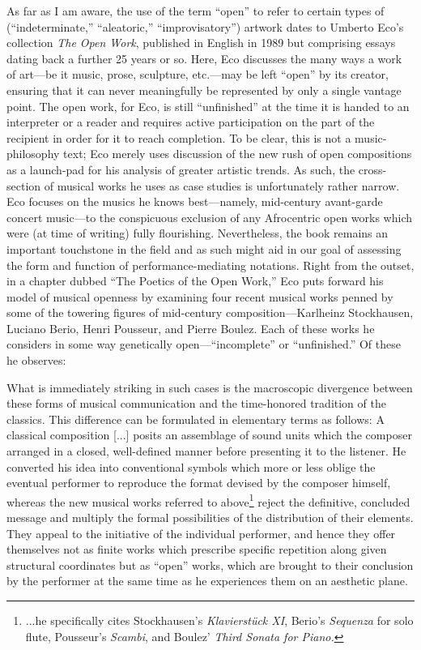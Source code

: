     As far as I am aware, the use of the term ``open'' to refer to certain types of (``indeterminate,'' ``aleatoric,'' ``improvisatory'') artwork dates to Umberto Eco's collection \textit{The Open Work}, published in English in 1989 but comprising essays dating back a further 25 years or so. Here, Eco discusses the many ways a work of art---be it music, prose, sculpture, etc.---may be left ``open'' by its creator, ensuring that it can never meaningfully be represented by only a single vantage point. The open work, for Eco, is still ``unfinished'' at the time it is handed to an interpreter or a reader and requires active participation on the part of the recipient in order for it to reach completion. To be clear, this is not a music-philosophy text; Eco merely uses discussion of the new rush of open compositions as a launch-pad for his analysis of greater artistic trends. As such, the cross-section of musical works he uses as case studies is unfortunately rather narrow. Eco focuses on the musics he knows best---namely, mid-century avant-garde concert music---to the conspicuous exclusion of any Afrocentric open works which were (at time of writing) fully flourishing. Nevertheless, the book remains an important touchstone in the field and as such might aid in our goal of assessing the form and function of performance-mediating notations. Right from the outset, in a chapter dubbed ``The Poetics of the Open Work,'' Eco puts forward his model of musical openness by examining four recent musical works penned by some of the towering figures of mid-century composition---Karlheinz Stockhausen, Luciano Berio, Henri Pousseur, and Pierre Boulez. Each of these works he considers in some way genetically open---``incomplete'' or ``unfinished.'' Of these he observes:

        \begin{smallquote}
            What is immediately striking in such cases is the macroscopic divergence between these forms of musical communication and the time-honored tradition of the classics. This difference can be formulated in elementary terms as follows: A classical composition [...] posits an assemblage of sound units which the composer arranged in a closed, well-defined manner before presenting it to the listener. He converted his idea into conventional symbols which more or less oblige the eventual performer to reproduce the format devised by the composer himself, whereas the new musical works referred to above\footnote{...he specifically cites Stockhausen's \textit{Klavierstück XI}, Berio's \textit{Sequenza} for solo flute, Pousseur's \textit{Scambi}, and Boulez' \textit{Third Sonata for Piano.}} reject the definitive, concluded message and multiply the formal possibilities of the distribution of their elements. They appeal to the initiative of the individual performer, and hence they offer themselves not as finite works which prescribe specific repetition along given structural coordinates but as ``open'' works, which are brought to their conclusion by the performer at the same time as he experiences them on an aesthetic plane.\autocite[2--3]{Eco_Robey_1989}
        \end{smallquote}

